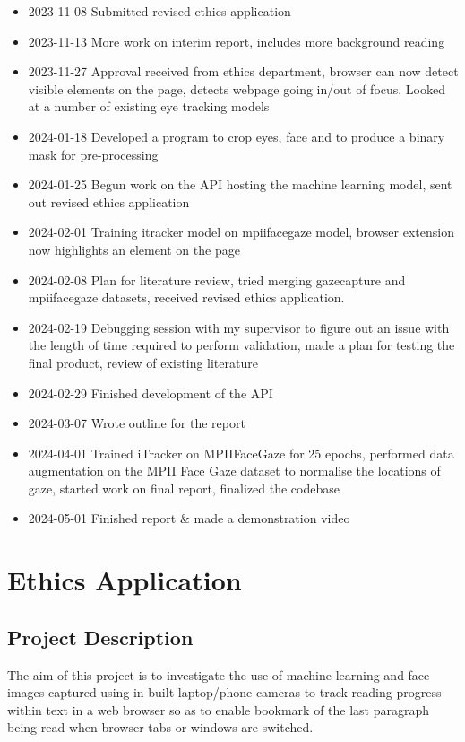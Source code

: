 \documentclass{report}
\begin{document}
\begin{itemize}
    \item 2023-11-08 Submitted revised ethics application 
    \item 2023-11-13 More work on interim report, includes more background reading 
    \item 2023-11-27 Approval received from ethics department, browser can now detect visible elements on the page, detects webpage going in/out of focus. Looked at a number of existing eye tracking models   
    \item 2024-01-18 Developed a program to crop eyes, face and to produce a binary mask for pre-processing 
    \item 2024-01-25 Begun work on the API hosting the machine learning model, sent out revised ethics application 
    \item 2024-02-01 Training itracker model on mpiifacegaze model, browser extension now highlights an element on the page 
    \item 2024-02-08 Plan for literature review, tried merging gazecapture and mpiifacegaze datasets, received revised ethics application. 
    \item 2024-02-19 Debugging session with my supervisor to figure out an issue with the length of time required to perform validation, made a plan for testing the final product, review of existing literature 
    \item 2024-02-29 Finished development of the API 
    \item 2024-03-07 Wrote outline for the report
    \item 2024-04-01 Trained iTracker on MPIIFaceGaze for 25 epochs, performed data augmentation on the MPII Face Gaze dataset to normalise the locations of gaze, started work on final report, finalized the codebase 
    \item 2024-05-01 Finished report \& made a demonstration video 
\end{itemize}

\chapter{Ethics Application}\label{sec:ethics-app}

\section*{Project Description}

The aim of this project is to investigate the use of machine learning and face images captured using in-built laptop/phone cameras to track reading progress within text in a web browser so as to enable bookmark of the last paragraph being read when browser tabs or windows are switched.
\end{document}
